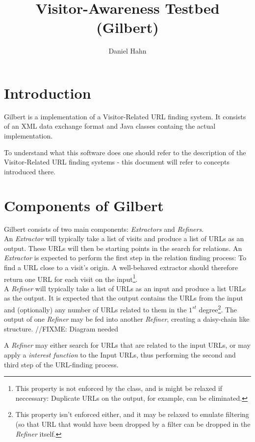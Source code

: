 \documentclass[a4paper]{danarticle}
\begin{document}
  \author{Daniel Hahn}
  \title{Visitor-Awareness Testbed (Gilbert)}
  \maketitle
  
  \section*{Introduction}
    Gilbert is a implementation of a Visitor-Related URL finding system. It
    consists of an XML data exchange format and Java classes containg the
    actual implementation.
    
    To understand what this software does one should refer to the
    description of the Visitor-Related URL finding systems - this
    document will refer to concepts introduced there.
  \section*{Components of Gilbert}
    Gilbert consists of two main components: \textit{Extractors} and 
    \textit{Refiners}.
    \\
    An \textit{Extractor} will typically take a list of visits and produce
    a list of URLs as an output. These URLs will then be starting points in
    the search for relations. An \textit{Extractor} is expected to perform
    the first step in the relation finding process: To find a URL close to
    a visit's origin. A well-behaved extractor should therefore return
    one URL for each visit on the input\footnote{This property is not enforced
    by the class, and is might be relaxed if neccessary: Duplicate URLs on
    the output, for example, can be eliminated.}.
    \\
    A \textit{Refiner} will typically take a list of URLs as an input and
    produce a list URLs as the output. It is expected that the output contains
    the URLs from the input and (optionally)
    any number of URLs related to them in the
    $ 1^{st} $ degree\footnote{This property isn't enforced either, and it
    may be relaxed to emulate filtering (so that URL that would have been
    dropped by a filter can be dropped in the \textit{Refiner} itself.}.
    The output of one \textit{Refiner} may be fed into another \textit{Refiner},
    creating a daisy-chain like structure. 
    //FIXME: Diagram needed
    
    A \textit{Refiner} may either search for URLs that are related to the
    input URLs, or may apply a \textit{interest function} to the Input URLs,
    thus performing the second and third step of the URL-finding process.
\end{document}
